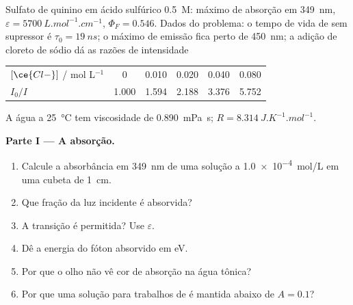 \begin{problem}
\label{pb:b3:electronic-spectroscopy:1}
Sulfato de quinino em ácido sulfúrico \qty{0.5}{M}: máximo de absorção em \qty{349}{nm},
$\varepsilon = \qty{5700}{L.mol^{-1}.cm^{-1}}$, $\Phi_F = 0.546$. Dados do problema: o
tempo de vida de  sem supressor é $\tau_0 = \qty{19}{ns}$; o máximo de
emissão fica perto de \qty{450}{nm}; a adição de cloreto de sódio dá as razões de intensidade
\begin{center}\small
\begin{tabular}{lccccc}
\hline
$[\ce{Cl-}]$ / mol L$^{-1}$ & 0 & 0.010 & 0.020 & 0.040 & 0.080 \\
$I_0/I$ & 1.000 & 1.594 & 2.188 & 3.376 & 5.752 \\ \hline
\end{tabular}
\end{center}
A água a \qty{25}{\celsius} tem viscosidade de \qty{0.890}{mPa.s}; $R =
\qty{8.314}{J.K^{-1}.mol^{-1}}$.

\medskip\noindent\textbf{Parte I --- A absorção.}
\begin{enumerate}
  \item Calcule a absorbância em \qty{349}{nm} de uma solução a \qty{1.0e-4}{mol/L} em uma
        cubeta de \qty{1}{cm}.
  \item Que fração da luz incidente é absorvida?
  \item A transição é permitida? Use $\varepsilon$.
  \item Dê a energia do fóton absorvido em eV.
  \item Por que o olho não vê cor de absorção na água tônica?
  \item Por que uma solução para trabalhos de  é mantida abaixo de $A = 0.1$?
\end{enumerate}


\end{problem}
